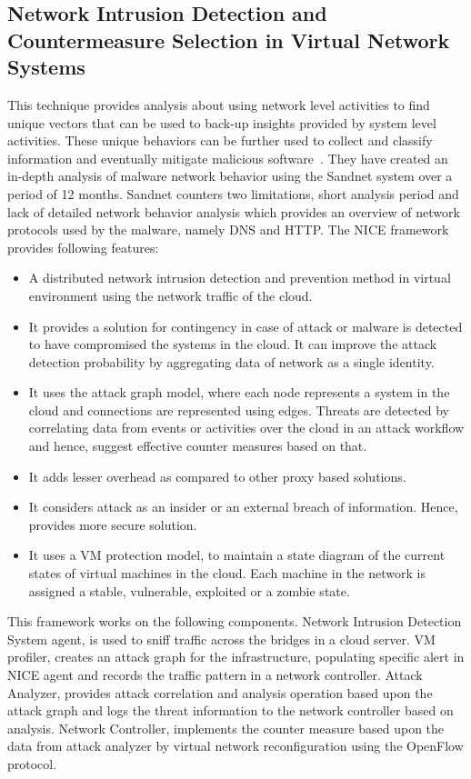 \documentclass[11pt]{article}
\begin{document}
	\subsection{Network Intrusion Detection and Countermeasure Selection in Virtual Network Systems}
	This technique provides analysis about using network level activities to find unique vectors that can be used to back-up insights provided by system level activities. These unique behaviors can be further used to collect and classify information and eventually mitigate malicious software~\cite{chung2013nice}.
	They have created an in-depth analysis of malware network behavior using the Sandnet system over a period of 12 months. Sandnet counters two limitations, short analysis period and lack of detailed network behavior analysis which provides an overview of network protocols used by the malware, namely DNS and HTTP. 
	The NICE framework provides following features:
	\begin{itemize}
		\item A distributed network intrusion detection and prevention method in virtual environment using the network traffic of the cloud.
		\item It provides a solution for contingency in case of attack or malware is detected to have compromised the systems in the cloud. It can improve the attack detection probability by aggregating data of network as a single identity.
		\item It uses the attack graph model, where each node represents a system in the cloud and connections are represented using edges. Threats are detected by correlating data from events or activities over the cloud in an attack workflow and hence, suggest effective counter measures based on that.
		\item It adds lesser overhead as compared to other proxy based solutions.
		\item It considers attack as an insider or an external breach of information. Hence, provides more secure solution.
		\item It uses a VM protection model, to maintain a state diagram of the current states of virtual machines in the cloud. Each machine in the network is assigned a stable, vulnerable, exploited or a zombie state.
	\end{itemize}
	This framework works on the following components. Network Intrusion Detection System agent, is used to sniff traffic across the bridges in a cloud server. VM profiler, creates an attack graph for the infrastructure, populating specific alert in NICE agent and records the traffic pattern in a network controller. Attack Analyzer, provides attack correlation and analysis operation based upon the attack graph and logs the threat information to the network controller based on analysis. Network Controller, implements the counter measure based upon the data from attack analyzer by virtual network reconfiguration using the OpenFlow protocol.
\end{document}
